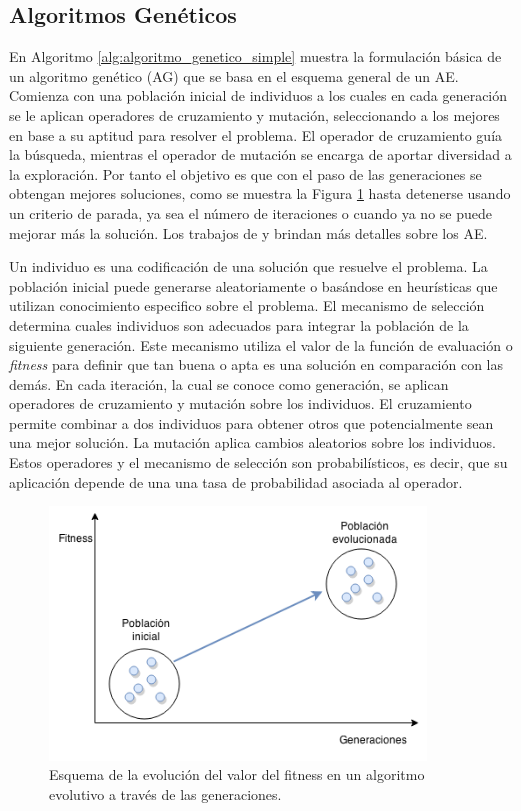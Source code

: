 \subsection{Algoritmos Genéticos}
En Algoritmo \ref{alg:algoritmo_genetico_simple} muestra la formulación básica de un algoritmo genético (AG) que se basa en el esquema general de un AE. Comienza con una población inicial de individuos a los cuales en cada generación se le aplican operadores de cruzamiento y mutación, seleccionando a los mejores en base a su aptitud para resolver el problema. El operador de cruzamiento guía la búsqueda, mientras el operador de mutación se encarga de aportar diversidad a la exploración. Por tanto el objetivo es que con el paso de las generaciones se obtengan mejores soluciones, como se muestra la Figura \ref{fig:fitness_generaciones} hasta detenerse usando un criterio de parada, ya sea el número de iteraciones o cuando ya no se puede mejorar más la solución. Los trabajos de \citet{Goldberg1989} y \citet{Mitchell1996} brindan más detalles sobre los AE.

Un individuo es una codificación de una solución que resuelve el problema. La población inicial puede generarse aleatoriamente o basándose en heurísticas que utilizan conocimiento especifico sobre el problema. El mecanismo de selección determina cuales individuos son adecuados para integrar la población de la siguiente generación. Este mecanismo utiliza el valor de la función de evaluación o \emph{fitness} para definir que tan buena o apta es una solución en comparación con las demás. En cada iteración, la cual se conoce como generación, se aplican operadores de cruzamiento y mutación sobre los individuos. El cruzamiento permite combinar a dos individuos para obtener otros que potencialmente sean una mejor solución. La mutación aplica cambios aleatorios sobre los individuos. Estos operadores y el mecanismo de selección son probabilísticos, es decir, que su aplicación depende de una una tasa de probabilidad asociada al operador.


\begin{figure}[H]
	\centering
	\includegraphics[width=10cm]{Figures/fitness_generaciones}
	\caption[Esquema de la evolución del valor del fitness en un algoritmo evolutivo ]{Esquema de la evolución del valor del fitness en un algoritmo evolutivo a través de las generaciones.}
	\label{fig:fitness_generaciones}
\end{figure}

